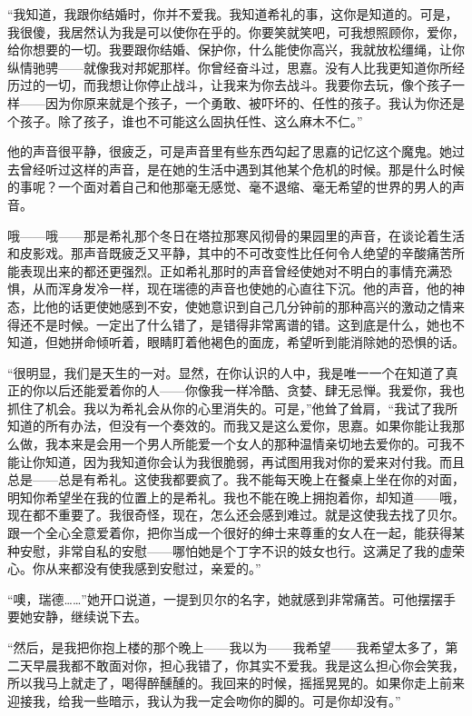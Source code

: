 \par “我知道，我跟你结婚时，你并不爱我。我知道希礼的事，这你是知道的。可是，我很傻，我居然认为我是可以使你在乎的。你要笑就笑吧，可我想照顾你，爱你，给你想要的一切。我要跟你结婚、保护你，什么能使你高兴，我就放松缰绳，让你纵情驰骋——就像我对邦妮那样。你曾经奋斗过，思嘉。没有人比我更知道你所经历过的一切，而我想让你停止战斗，让我来为你去战斗。我要你去玩，像个孩子一样——因为你原来就是个孩子，一个勇敢、被吓坏的、任性的孩子。我认为你还是个孩子。除了孩子，谁也不可能这么固执任性、这么麻木不仁。”
\par 他的声音很平静，很疲乏，可是声音里有些东西勾起了思嘉的记忆这个魔鬼。她过去曾经听过这样的声音，是在她的生活中遇到其他某个危机的时候。那是什么时候的事呢？一个面对着自己和他那毫无感觉、毫不退缩、毫无希望的世界的男人的声音。
\par 哦——哦——那是希礼那个冬日在塔拉那寒风彻骨的果园里的声音，在谈论着生活和皮影戏。那声音既疲乏又平静，其中的不可改变性比任何令人绝望的辛酸痛苦所能表现出来的都还更强烈。正如希礼那时的声音曾经使她对不明白的事情充满恐惧，从而浑身发冷一样，现在瑞德的声音也使她的心直往下沉。他的声音，他的神态，比他的话更使她感到不安，使她意识到自己几分钟前的那种高兴的激动之情来得还不是时候。一定出了什么错了，是错得非常离谱的错。这到底是什么，她也不知道，但她拼命倾听着，眼睛盯着他褐色的面庞，希望听到能消除她的恐惧的话。
\par “很明显，我们是天生的一对。显然，在你认识的人中，我是唯一一个在知道了真正的你以后还能爱着你的人——你像我一样冷酷、贪婪、肆无忌惮。我爱你，我也抓住了机会。我以为希礼会从你的心里消失的。可是，”他耸了耸肩，“我试了我所知道的所有办法，但没有一个奏效的。而我又是这么爱你，思嘉。如果你能让我那么做，我本来是会用一个男人所能爱一个女人的那种温情亲切地去爱你的。可我不能让你知道，因为我知道你会认为我很脆弱，再试图用我对你的爱来对付我。而且总是——总是有希礼。这使我都要疯了。我不能每天晚上在餐桌上坐在你的对面，明知你希望坐在我的位置上的是希礼。我也不能在晚上拥抱着你，却知道——哦，现在都不重要了。我很奇怪，现在，怎么还会感到难过。就是这使我去找了贝尔。跟一个全心全意爱着你，把你当成一个很好的绅士来尊重的女人在一起，能获得某种安慰，非常自私的安慰——哪怕她是个丁字不识的妓女也行。这满足了我的虚荣心。你从来都没有使我感到安慰过，亲爱的。”
\par “噢，瑞德……”她开口说道，一提到贝尔的名字，她就感到非常痛苦。可他摆摆手要她安静，继续说下去。
\par “然后，是我把你抱上楼的那个晚上——我以为——我希望——我希望太多了，第二天早晨我都不敢面对你，担心我错了，你其实不爱我。我是这么担心你会笑我，所以我马上就走了，喝得醉醺醺的。我回来的时候，摇摇晃晃的。如果你走上前来迎接我，给我一些暗示，我认为我一定会吻你的脚的。可是你却没有。”

